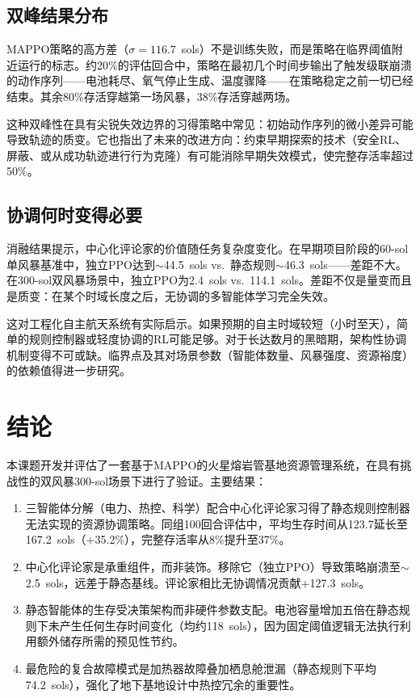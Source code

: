 \documentclass[11pt,a4paper]{ctexart}
\begin{document}
\subsection{双峰结果分布}

MAPPO策略的高方差（$\sigma = 116.7$~sols）不是训练失败，而是策略在临界阈值附近运行的标志。约20\%的评估回合中，策略在最初几个时间步输出了触发级联崩溃的动作序列——电池耗尽、氧气停止生成、温度骤降——在策略稳定之前一切已经结束。其余80\%存活穿越第一场风暴，38\%存活穿越两场。

这种双峰性在具有尖锐失效边界的习得策略中常见：初始动作序列的微小差异可能导致轨迹的质变。它也指出了未来的改进方向：约束早期探索的技术（安全RL、屏蔽、或从成功轨迹进行行为克隆）有可能消除早期失效模式，使完整存活率超过50\%。

\subsection{协调何时变得必要}

消融结果提示，中心化评论家的价值随任务复杂度变化。在早期项目阶段的60-sol单风暴基准中，独立PPO达到$\sim$44.5~sols vs.\ 静态规则$\sim$46.3~sols——差距不大。在300-sol双风暴场景中，独立PPO为2.4~sols vs.\ 114.1~sols。差距不仅是量变而且是质变：在某个时域长度之后，无协调的多智能体学习完全失效。

这对工程化自主航天系统有实际启示。如果预期的自主时域较短（小时至天），简单的规则控制器或轻度协调的RL可能足够。对于长达数月的黑暗期，架构性协调机制变得不可或缺。临界点及其对场景参数（智能体数量、风暴强度、资源裕度）的依赖值得进一步研究。

\section{结论}

本课题开发并评估了一套基于MAPPO的火星熔岩管基地资源管理系统，在具有挑战性的双风暴300-sol场景下进行了验证。主要结果：

\begin{enumerate}[label=(\arabic*)]
  \item 三智能体分解（电力、热控、科学）配合中心化评论家习得了静态规则控制器无法实现的资源协调策略。同组100回合评估中，平均生存时间从123.7延长至167.2~sols（+35.2\%），完整存活率从8\%提升至37\%。
  \item 中心化评论家是承重组件，而非装饰。移除它（独立PPO）导致策略崩溃至$\sim$2.5~sols，远差于静态基线。评论家相比无协调情况贡献+127.3~sols。
  \item 静态智能体的生存受决策架构而非硬件参数支配。电池容量增加五倍在静态规则下未产生任何生存时间变化（均约118~sols），因为固定阈值逻辑无法执行利用额外储存所需的预见性节约。
  \item 最危险的复合故障模式是加热器故障叠加栖息舱泄漏（静态规则下平均74.2~sols），强化了地下基地设计中热控冗余的重要性。
\end{enumerate}
\end{document}

